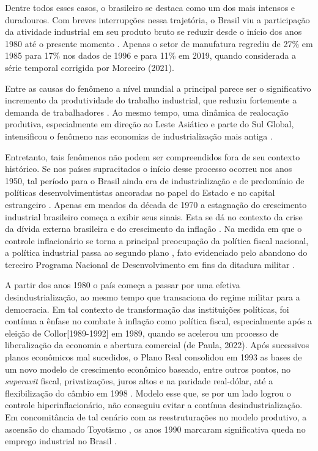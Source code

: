 Dentre todos esses casos, o brasileiro se destaca como um dos mais
intensos e duradouros. Com breves interrupções nessa trajetória, o
Brasil viu a participação da atividade industrial em seu produto bruto
se reduzir desde o início dos anos 1980 até o presente momento . Apenas o setor de
manufatura regrediu de 27\% em 1985 para 17\% nos dados de 1996 e para
11\% em 2019, quando considerada a série temporal corrigida por Morceiro
(2021).

Entre as causas do fenômeno a nível mundial a principal parece ser o
significativo incremento da produtividade do trabalho industrial, que
reduziu fortemente a demanda de trabalhadores \citep{rowthorn_growth_1999}. Ao mesmo tempo, uma dinâmica de realocação produtiva,
especialmente em direção ao Leste Asiático e parte do Sul Global,
intensificou o fenômeno nas economias de industrialização mais antiga
\citep{kollmeyer_explaining_2009}.

Entretanto, tais fenômenos não podem ser compreendidos fora de seu
contexto histórico. Se nos países supracitados o início desse processo
ocorreu nos anos 1950, tal período para o Brasil ainda era de
industrialização e de predomínio de políticas desenvolvimentistas
ancoradas no papel do Estado \citep{perissinotto_ideias_2023} e no capital
estrangeiro \citep{evans_dependent_1979}. Apenas em meados da década de 1970 a
estagnação do crescimento industrial brasileiro começa a exibir seus
sinais. Esta se dá no contexto da crise da dívida externa brasileira e
do crescimento da inflação \citep{hermannetal2015}. Na medida em que o controle
inflacionário se torna a principal preocupação da política fiscal
nacional, a política industrial passa ao segundo plano \citep{cano_brasil_2017},
fato evidenciado pelo abandono do terceiro Programa Nacional de
Desenvolvimento em fins da ditadura militar .

A partir dos anos 1980 o país começa a passar por uma efetiva
desindustrialização, ao mesmo tempo que transaciona do regime militar
para a democracia. Em tal contexto de transformação das instituições
políticas, foi contínua a ênfase no combate à inflação como política
fiscal, especialmente após a eleição de Collor{[}1989-1992{]} em 1989,
quando se acelerou um processo de liberalização da economia e abertura
comercial (de Paula, 2022). Após sucessivos planos econômicos mal
sucedidos, o Plano Real consolidou em 1993 as bases de um novo modelo de
crescimento econômico baseado, entre outros pontos, no \emph{superavit}
fiscal, privatizações, juros altos e na paridade real-dólar, até a
flexibilização do câmbio em 1998 . Modelo
esse que, se por um lado logrou o controle hiperinflacionário, não
conseguiu evitar a contínua desindustrialização. Em concomitância de tal
cenário com as reestruturações no modelo produtivo, a ascensão do
chamado Toyotismo , os anos 1990 marcaram significativa
queda no emprego industrial no Brasil .

